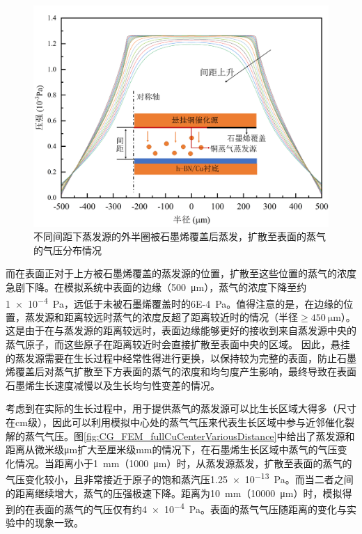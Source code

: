     \begin{figure}[htb]
        \includegraphics{pic/CG_FEM_halfCu.png}
        \caption{不同间距下蒸发源的外半圈被石墨烯覆盖后蒸发，扩散至表面的蒸气的气压分布情况}
        \label{fig:CG_FEM_halfCu}
    \end{figure}

    而在表面正对于上方被石墨烯覆盖的蒸发源的位置，扩散至这些位置的蒸气的浓度急剧下降。在模拟系统中表面的边缘（\SI{500}{\micro\meter}），蒸气的浓度下降至约\SI{1e-4}{\pascal}，远低于未被石墨烯覆盖时的\SI{6E-4}{\pascal}。值得注意的是，在边缘的位置，蒸发源和距离较远时蒸气的浓度反超了距离较近时的情况（半径$\geqslant \SI{450}{\micro\meter}$）。这是由于在与蒸发源的距离较远时，表面边缘能够更好的接收到来自蒸发源中央的蒸气原子，而这些原子在距离较近时会直接扩散至表面中央的区域。
    因此，悬挂的蒸发源需要在生长过程中经常性得进行更换，以保持较为完整的表面，防止石墨烯覆盖后对蒸气扩散至下方表面的蒸气的浓度和均匀度产生影响，最终导致在表面石墨烯生长速度减慢以及生长均匀性变差的情况。

    考虑到在实际的生长过程中，用于提供蒸气的蒸发源可以比生长区域大得多（尺寸在\si{\centi\meter}级），因此可以利用模拟中心处的蒸气气压来代表生长区域中参与近邻催化裂解的蒸气气压。图\ref{fig:CG_FEM_fullCuCenterVariousDistance}中给出了蒸发源和距离从微米级\si{\micro\meter}扩大至厘米级\si{\milli\meter}的情况下，在石墨烯生长区域中蒸气的气压变化情况。当距离小于\SI{1}{\milli\meter}（\SI{1000}{\micro\meter}）时，从蒸发源蒸发，扩散至表面的蒸气的气压变化较小，且非常接近于原子的饱和蒸汽压\SI{1.25e-13}{\pascal}。而当二者之间的距离继续增大，蒸气的压强极速下降。距离为\SI{10}{\milli\meter}（\SI{10000}{\micro\meter}）时，模拟得到的在表面的蒸气的气压仅有约\SI{4e-4}{\pascal}。表面的蒸气气压随距离的变化与实验中的现象一致。
    
